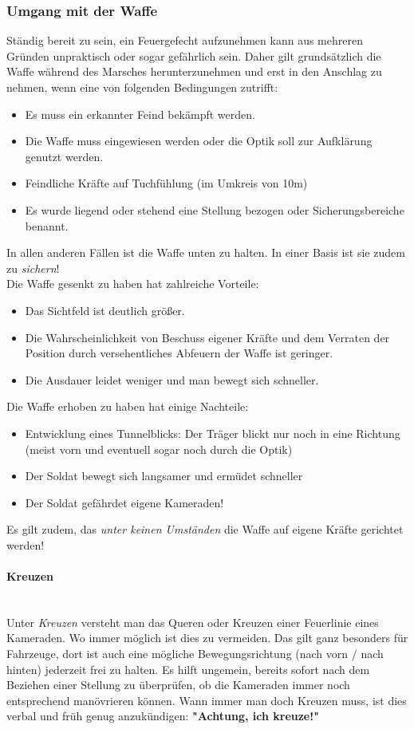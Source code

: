 \subsubsection{Umgang mit der Waffe}
Ständig bereit zu sein, ein Feuergefecht aufzunehmen kann aus mehreren Gründen unpraktisch oder sogar gefährlich sein. Daher gilt grundsätzlich die Waffe während des Marsches herunterzunehmen und erst in den Anschlag zu nehmen, wenn eine von folgenden Bedingungen zutrifft:
\begin{itemize}
\item Es muss ein erkannter Feind bekämpft werden.
\item Die Waffe muss eingewiesen werden oder die Optik soll zur Aufklärung genutzt werden.
\item Feindliche Kräfte auf Tuchfühlung (im Umkreis von 10m)
\item Es wurde liegend oder stehend eine Stellung bezogen oder Sicherungsbereiche benannt.
\end{itemize}
In allen anderen Fällen ist die Waffe unten zu halten. In einer Basis ist sie zudem zu \textit{sichern}!
\\Die Waffe gesenkt zu haben hat zahlreiche Vorteile:
\begin{itemize}
\item Das Sichtfeld ist deutlich größer.
\item Die Wahrscheinlichkeit von Beschuss eigener Kräfte und dem Verraten der Position durch versehentliches Abfeuern der Waffe ist geringer.
\item Die Ausdauer leidet weniger und man bewegt sich schneller.
\end{itemize}
Die Waffe erhoben zu haben hat einige Nachteile:
\begin{itemize}
\item Entwicklung eines Tunnelblicks: Der Träger blickt nur noch in eine Richtung (meist vorn und eventuell sogar noch durch die Optik)
\item Der Soldat bewegt sich langsamer und ermüdet schneller
\item Der Soldat gefährdet eigene Kameraden!
\end{itemize}
Es gilt zudem, das \textit{unter keinen Umständen} die Waffe auf eigene Kräfte gerichtet werden!
\paragraph{Kreuzen}$\ $\\
Unter \textit{Kreuzen} versteht man das Queren oder Kreuzen einer Feuerlinie eines Kameraden. Wo immer möglich ist dies zu vermeiden. Das gilt ganz besonders für Fahrzeuge, dort ist auch eine mögliche Bewegungsrichtung (nach vorn / nach hinten) jederzeit frei zu halten. Es hilft ungemein, bereits sofort nach dem Beziehen einer Stellung zu überprüfen, ob die Kameraden immer noch entsprechend manövrieren können. Wann immer man doch Kreuzen muss, ist dies verbal und früh genug anzukündigen: \textbf{"Achtung, ich kreuze!"}

